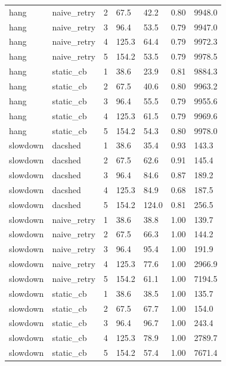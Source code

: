 \begin{table}[t]
{\begin{tabular}{lllllll}
hang & naive\_retry & 2 & 67.5 & 42.2 & 0.80 & 9948.0 \\
hang & naive\_retry & 3 & 96.4 & 53.5 & 0.79 & 9947.0 \\
hang & naive\_retry & 4 & 125.3 & 64.4 & 0.79 & 9972.3 \\
hang & naive\_retry & 5 & 154.2 & 53.5 & 0.79 & 9978.5 \\
hang & static\_cb & 1 & 38.6 & 23.9 & 0.81 & 9884.3 \\
hang & static\_cb & 2 & 67.5 & 40.6 & 0.80 & 9963.2 \\
hang & static\_cb & 3 & 96.4 & 55.5 & 0.79 & 9955.6 \\
hang & static\_cb & 4 & 125.3 & 61.5 & 0.79 & 9969.6 \\
hang & static\_cb & 5 & 154.2 & 54.3 & 0.80 & 9978.0 \\
slowdown & dacshed & 1 & 38.6 & 35.4 & 0.93 & 143.3 \\
slowdown & dacshed & 2 & 67.5 & 62.6 & 0.91 & 145.4 \\
slowdown & dacshed & 3 & 96.4 & 84.6 & 0.87 & 189.2 \\
slowdown & dacshed & 4 & 125.3 & 84.9 & 0.68 & 187.5 \\
slowdown & dacshed & 5 & 154.2 & 124.0 & 0.81 & 256.5 \\
slowdown & naive\_retry & 1 & 38.6 & 38.8 & 1.00 & 139.7 \\
slowdown & naive\_retry & 2 & 67.5 & 66.3 & 1.00 & 144.2 \\
slowdown & naive\_retry & 3 & 96.4 & 95.4 & 1.00 & 191.9 \\
slowdown & naive\_retry & 4 & 125.3 & 77.6 & 1.00 & 2966.9 \\
slowdown & naive\_retry & 5 & 154.2 & 61.1 & 1.00 & 7194.5 \\
slowdown & static\_cb & 1 & 38.6 & 38.5 & 1.00 & 135.7 \\
slowdown & static\_cb & 2 & 67.5 & 67.7 & 1.00 & 154.0 \\
slowdown & static\_cb & 3 & 96.4 & 96.7 & 1.00 & 243.4 \\
slowdown & static\_cb & 4 & 125.3 & 78.9 & 1.00 & 2789.7 \\
slowdown & static\_cb & 5 & 154.2 & 57.4 & 1.00 & 7671.4 \\
\bottomrule
\end{tabular}%
}
\end{table}
